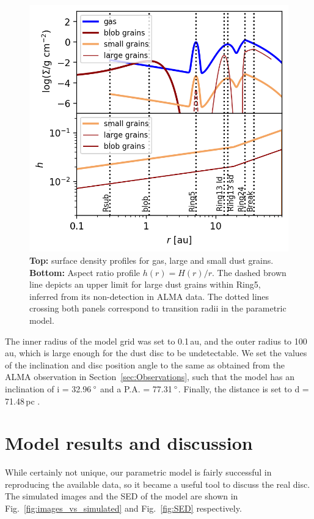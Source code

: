 \documentclass[fleqn,usenatbib,useAMS]{mnras}
\begin{document}
\begin{figure}
	\includegraphics[width=\columnwidth]{allprofiles.png}
        \caption{{\bf Top:} surface density profiles for gas, large and small dust grains. {\bf Bottom:} Aspect ratio profile $h(r)= H(r)/r$. The dashed brown line depicts an upper limit for large dust grains within Ring5, inferred from its non-detection in ALMA data. The dotted lines crossing both panels correspond to transition radii in the parametric model.}
    \label{fig:profiles}
\end{figure}

The inner radius of the model grid was set to 0.1\,au, and the outer radius to 100\,au, which is large enough for the dust disc to be undetectable. We set the values of the inclination and disc position angle to the same as obtained from the ALMA observation in Section~\ref{sec:Observations}, such that the model has an inclination of i = 32.96\,$\hbox{$^\circ$}$ and a P.A. = 77.31\,$\hbox{$^\circ$}$. Finally, the distance is set to d = 71.48\,pc \citep{gaiacollaboration2020gaia}.

\section{Model results and discussion} \label{sec:results}

While certainly not unique, our parametric model is fairly successful in reproducing the available data, so it became a useful tool to discuss the real disc. The simulated images and the SED of the model are shown in Fig.~\ref{fig:images_vs_simulated} and Fig.~\ref{fig:SED} respectively.
\end{document}
